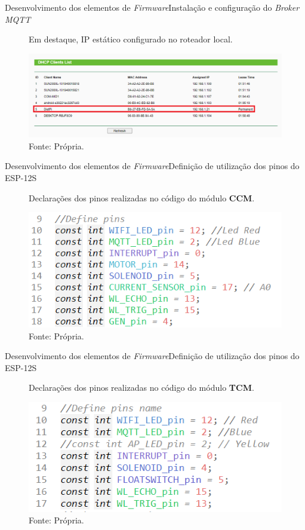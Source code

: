\begin{frame}{Desenvolvimento dos elementos de \textit{Firmware}}{Instalação e configuração do \textit{Broker MQTT}}
  \begin{figure}[H]
    \centering
    \caption{Em destaque, IP estático configurado no roteador local.}
    \includegraphics[width=1
    \textwidth]{figuras/ip_estatico_rasp.png}
    \caption*{\tiny{Fonte: Própria.}}
    \label{fig:roteador}
  \end{figure}
\end{frame}

\begin{frame}{Desenvolvimento dos elementos de \textit{Firmware}}{{Definição de utilização dos pinos do ESP-12S}}
  \begin{figure}[H]
    \centering
    \caption{Declarações dos pinos realizadas no código do módulo \textbf{CCM}.}
    \includegraphics[width=0.5
    \textwidth]{figuras/pinos_definicao_ccm2.png}
    \caption*{\tiny{Fonte: Própria.}}
    \label{fig:definicao_pinos_ccm}
  \end{figure}
\end{frame}

\begin{frame}{Desenvolvimento dos elementos de \textit{Firmware}}{{Definição de utilização dos pinos do ESP-12S}}
  \begin{figure}[H]
    \centering
    \caption{Declarações dos pinos realizadas no código do módulo \textbf{TCM}.}
    \includegraphics[width=0.5
    \textwidth]{figuras/pinos_definicao_tcm.png}
    \caption*{\tiny{Fonte: Própria.}}
    \label{fig:definicao_pinos_tcm}
  \end{figure}
\end{frame}


